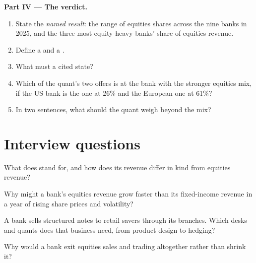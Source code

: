 \begin{problem}
\medskip\noindent\textbf{Part IV --- The verdict.}
\begin{enumerate}[resume]
\item State the \emph{named result}: the range of equities shares across the nine banks in 2025, and the three most
equity-heavy banks' share of equities revenue.
\item Define a  and a .
\item What must a cited  state?
\item Which of the quant's two offers is at the bank with the stronger equities mix, if the US bank is the one at 26\%
and the European one at 61\%?
\item In two sentences, what should the quant weigh beyond the mix?
\end{enumerate}
\end{problem}

\section{Interview questions}

\begin{interviewq}\label{iq:in:bank-markets-divisions:1}
What does  stand for, and how does its revenue differ in kind from equities revenue?
\end{interviewq}

\begin{interviewq}\label{iq:in:bank-markets-divisions:2}
Why might a bank's equities revenue grow faster than its fixed-income revenue in a year of rising share prices and
volatility?
\end{interviewq}

\begin{interviewq}\label{iq:in:bank-markets-divisions:3}
A bank sells structured notes to retail savers through its branches. Which desks and quants does that business need,
from product design to hedging?
\end{interviewq}

\begin{interviewq}\label{iq:in:bank-markets-divisions:4}
Why would a bank exit equities sales and trading altogether rather than shrink it?
\end{interviewq}

